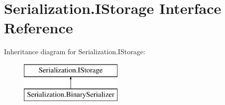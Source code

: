 \hypertarget{interface_serialization_1_1_i_storage}{}\section{Serialization.\+I\+Storage Interface Reference}
\label{interface_serialization_1_1_i_storage}
Inheritance diagram for Serialization.\+I\+Storage\+:\begin{figure}[H]
\begin{center}
\leavevmode
\includegraphics[height=2.000000cm]{interface_serialization_1_1_i_storage}
\end{center}
\end{figure}
